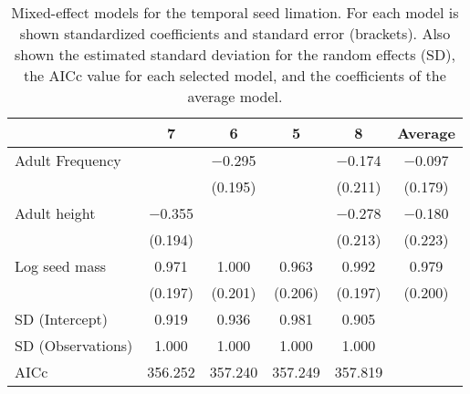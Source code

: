 \begin{table}

\caption{Mixed-effect models for the temporal seed limation. For each model is shown standardized coefficients and standard error (brackets). Also shown the estimated standard deviation for the random effects (SD), the AICc value for each selected model, and the coefficients of the average model.}
\centering
\begin{tabular}[t]{lccccc}
\toprule
  & 7 & 6 & 5 & 8 & Average\\
\midrule
Adult Frequency &  & \num{-0.295} &  & \num{-0.174} & \num{-0.097}\\
 &  & (\num{0.195}) &  & (\num{0.211}) & (\num{0.179})\\
Adult height & \num{-0.355} &  &  & \num{-0.278} & \num{-0.180}\\
 & (\num{0.194}) &  &  & (\num{0.213}) & (\num{0.223})\\
Log seed mass & \num{0.971} & \num{1.000} & \num{0.963} & \num{0.992} & \num{0.979}\\
 & (\num{0.197}) & (\num{0.201}) & (\num{0.206}) & (\num{0.197}) & (\num{0.200})\\
SD (Intercept) & \num{0.919} & \num{0.936} & \num{0.981} & \num{0.905} & \\
SD (Observations) & \num{1.000} & \num{1.000} & \num{1.000} & \num{1.000} & \\
\midrule
AICc & \num{356.252} & \num{357.240} & \num{357.249} & \num{357.819} & \\
\bottomrule
\end{tabular}
\end{table}
